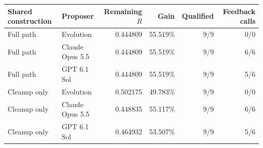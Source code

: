 \begin{tabular}{llrrrr}
\toprule
Shared construction & Proposer & Remaining $R$ & Gain & Qualified & Feedback calls \\
\midrule
Full path & Evolution & 0.444809 & 55.519\% & 9/9 & 0/0 \\
Full path & Claude Opus 5.5 & 0.444809 & 55.519\% & 9/9 & 6/6 \\
Full path & GPT 6.1 Sol & 0.444809 & 55.519\% & 9/9 & 5/6 \\
Cleanup only & Evolution & 0.502175 & 49.783\% & 9/9 & 0/0 \\
Cleanup only & Claude Opus 5.5 & 0.448835 & 55.117\% & 9/9 & 6/6 \\
Cleanup only & GPT 6.1 Sol & 0.464932 & 53.507\% & 9/9 & 5/6 \\
\bottomrule
\end{tabular}
